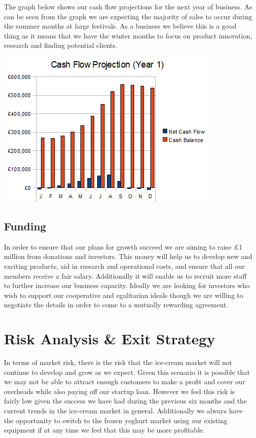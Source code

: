 \documentclass{article}
\begin{document}
The graph below shows our cash flow projections for the next year of business. As can be seen from the graph we are expecting the majority of sales to occur during the summer months at large festivals. As a business we believe this is a good thing as it means that we have the winter months to focus on product innovation, research and finding potential clients.
\begin{center}
\includegraphics[scale=1.0]{cashFlowYear1.png}
\end{center}

\subsection{Funding}

In order to ensure that our plans for growth succeed we are aiming to raise \pounds 1 million from donations and investors. This money will help us to develop new and exciting products, aid in research and operational costs, and ensure that all our members receive a fair salary. Additionally it will enable us to recruit more staff to further increase our business capacity. Ideally we are looking for investors who wish to support our cooperative and egalitarian ideals though we are willing to negotiate the details in order to come to a mutually rewarding agreement.

\section{Risk Analysis \& Exit Strategy}

In terms of market risk, there is the risk that the ice-cream market will not continue to develop and grow as we expect. Given this scenario it is possible that we may not be able to attract enough customers to make a profit and cover our overheads while also paying off our startup loan. However we feel this risk is fairly low given the success we have had during the previous six months and the current trends in the ice-cream market in general. Additionally we always have the opportunity to switch to the frozen yoghurt market using our existing equipment if at any time we feel that this may be more profitable. \\
\end{document}
